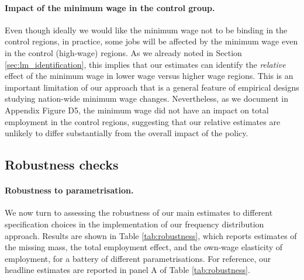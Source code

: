 \paragraph{Impact of the minimum wage in the control group.} Even though ideally we would like the minimum wage not to be binding in the control regions, in practice, some jobs will be affected by the minimum wage even in the control (high-wage) regions. As we already noted in Section \ref{sec:lm_identification}, this implies that our estimates can identify the \textit{relative} effect of the minimum wage in lower wage versus higher wage regions. This is an important limitation of our approach that is a general feature of empirical designs studying nation-wide minimum wage changes. Nevertheless, as we document in Appendix Figure D5, the minimum wage did not have an impact on total employment in the control regions, suggesting that our relative estimates are unlikely to differ substantially from the overall impact of the policy.

\subsection{Robustness checks} \label{sec:lm_robustness}

\paragraph{Robustness to parametrisation.} We now turn to assessing the robustness of our main estimates to different specification choices in the implementation of our frequency distribution approach. Results are shown in Table \ref{tab:robustness}, which reports estimates of the missing mass, the total employment effect, and the own-wage elasticity of employment, for a battery of different parametrisations. For reference, our headline estimates are reported in panel A of Table \ref{tab:robustness}. 

